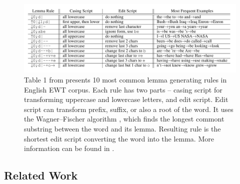 \begin{figure}[!ht]
\centering
\includegraphics[width=1\textwidth]{../img/lemma_rules}
\protect\caption{
Table 1 from \citep{Straka2019b} presents 10 most common lemma generating rules in English EWT corpus. Each rule has two parts -- casing script for transforming uppercase and lowercase letters, and edit script. Edit script can transform prefix, suffix, or also a root of the word. It uses the Wagner–Fischer algorithm \citep{Wagner}, which finds the longest commont substring between the word and its lemma. Resulting rule is the shortest edit script converting the word into the lemma. More information can be found in \citep{Straka2019b}.
}
\label{fig:lemma_rules}
\end{figure}

\subsection{Related Work}
